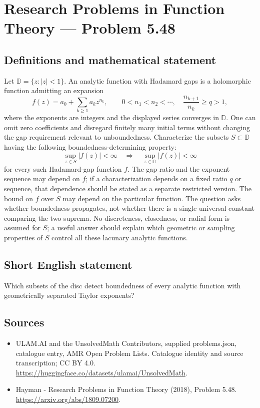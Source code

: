 \documentclass[11pt,a4paper]{article}
\begin{document}
\section*{Research Problems in Function Theory — Problem 5.48}\label{statement}

\subsection{Definitions and mathematical statement}
Let $\mathbb D=\{z:|z|<1\}$. An analytic function with Hadamard gaps is a holomorphic function admitting an expansion
\[
f(z)=a_0+\sum_{k\ge1}a_kz^{n_k},\qquad
0<n_1<n_2<\cdots,\quad
\frac{n_{k+1}}{n_k}\ge q>1,
\]
where the exponents are integers and the displayed series converges in $\mathbb D$. One can omit zero coefficients and disregard finitely many initial terms without changing the gap requirement relevant to unboundedness.
Characterize the subsets $S\subset\mathbb D$ having the following boundedness-determining property:
\[
\sup_{z\in S}|f(z)|<\infty
\quad\Longrightarrow\quad
\sup_{z\in\mathbb D}|f(z)|<\infty
\]
for every such Hadamard-gap function $f$. The gap ratio and the exponent sequence may depend on $f$; if a characterization depends on a fixed ratio $q$ or sequence, that dependence should be stated as a separate restricted version.
The bound on $f$ over $S$ may depend on the particular function. The question asks whether boundedness propagates, not whether there is a single universal constant comparing the two suprema. No discreteness, closedness, or radial form is assumed for $S$; a useful answer should explain which geometric or sampling properties of $S$ control all these lacunary analytic functions.
\subsection{Short English statement}
Which subsets of the disc detect boundedness of every analytic function with geometrically separated Taylor exponents?
\subsection{Sources}
\begin{itemize}
\item[S1] ULAM.AI and the UnsolvedMath Contributors, supplied problems.json, catalogue entry, AMR Open Problem Lists. Catalogue identity and source transcription; CC BY 4.0.
\url{https://huggingface.co/datasets/ulamai/UnsolvedMath}.
\item[S2] Hayman - Research Problems in Function Theory (2018), Problem 5.48. 
\url{https://arxiv.org/abs/1809.07200}.
\end{itemize}
\end{document}
